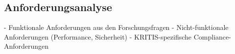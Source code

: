 \subsection{Anforderungsanalyse} \label{sec:Anforderungsanalyse}

- Funktionale Anforderungen aus den Forschungsfragen
- Nicht-funktionale Anforderungen (Performance, Sicherheit)
- KRITIS-spezifische Compliance-Anforderungen